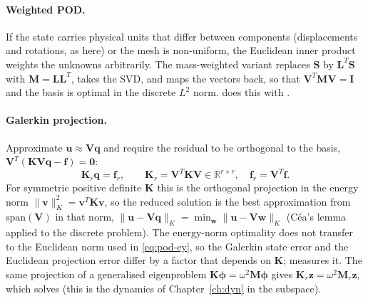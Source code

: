 \paragraph{Weighted POD.}
If the state carries physical units that differ between components (displacements and rotations, as here) or the mesh is non-uniform, the Euclidean inner product weights the unknowns arbitrarily. The mass-weighted variant replaces $\bm S$ by $\bm L^T\bm S$ with $\bm M=\bm L\bm L^T$, takes the SVD, and maps the vectors back, so that $\bm V^T\bm M\bm V=\bm I$ and the basis is optimal in the discrete $L^2$ norm.  does this with .

\paragraph{Galerkin projection.}
Approximate $\bm u\approx\bm V\bm q$ and require the residual to be orthogonal to the basis, $\bm V^T(\bm K\bm V\bm q-\bm f)=\bm 0$:
\begin{equation}\label{eq:pod-galerkin}
\bm K_r\bm q=\bm f_r,\qquad \bm K_r=\bm V^T\bm K\bm V\in\mathbb R^{r\times r},\quad \bm f_r=\bm V^T\bm f .
\end{equation}
For symmetric positive definite $\bm K$ this is the orthogonal projection in the energy norm $\|\bm v\|_K^2=\bm v^T\bm K\bm v$, so the reduced solution is the best approximation from $\mathrm{span}(\bm V)$ in that norm, $\|\bm u-\bm V\bm q\|_K=\min_{\bm w}\|\bm u-\bm V\bm w\|_K$ (Céa's lemma applied to the discrete problem). The energy-norm optimality does not transfer to the Euclidean norm used in \cref{eq:pod-ey}, so the Galerkin state error and the Euclidean projection error differ by a factor that depends on $\bm K$;  measures it. The same projection of a generalised eigenproblem $\bm K\bm\phi=\omega^2\bm M\bm\phi$ gives $\bm K_r\bm z=\omega^2\bm M_r\bm z$, which  solves (this is the dynamics of Chapter~\ref{ch:dyn} in the subspace).


